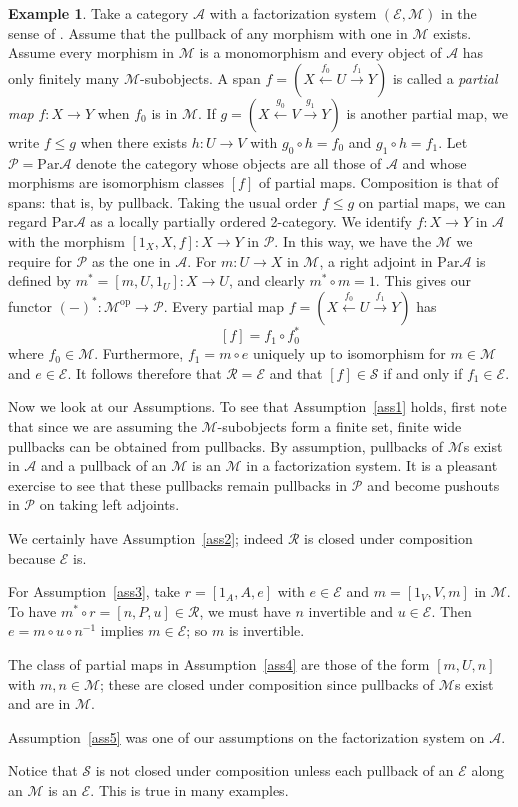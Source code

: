 \documentclass[a4paper,12pt,reqno]{amsart}
\theoremstyle{definition}
\newtheorem{example}[theorem]{Example}
\theoremstyle{fact}
\theoremstyle{genquest}
\theoremstyle{step}
\newcommand{\dd}{\colon}
\newcommand{\lra}{\longrightarrow}
\newcommand{\lla}{\longleftarrow}
\newcommand{\ra}{\rightarrow}
\def\CA{{\mathscr A}}
\def\CE{{\mathscr E}}
\def\CM{{\mathscr M}}
\def\CP{{\mathscr P}}
\def\CR{{\mathscr R}}
\def\CS{{\mathscr S}}
\begin{document}
\begin{example}\label{Ex1+}
Take a category $\CA$ with a factorization system $(\CE,\CM)$ in the sense of \cite{FreydKelly}. 
Assume that the pullback of any morphism with one in $\CM$ exists. 
Assume every morphism in $\CM$ is a monomorphism and every object
of $\CA$ has only finitely many $\CM$-subobjects. 
A span $f = (X\stackrel{f_0}\lla U \stackrel{f_1}\lra Y)$ is called a {\em partial map}
$f : X\lra Y$ when $f_0$ is in $\CM$. 
If $g = (X\stackrel{g_0}\lla V \stackrel{g_1}\lra Y)$ is another partial map,
we write $f\le g$ when there exists $h:U\ra V$ with $g_0\circ h=f_0$ and $g_1\circ h=f_1$.  
Let $\CP= \mathrm{Par}\CA$ 
denote the category
whose objects are all those of $\CA$ and whose morphisms are isomorphism
classes $[f]$ of partial maps. Composition is that of spans: that is, by pullback.
Taking the usual order $f\le g$ on partial maps, we can regard $\mathrm{Par}\CA$
as a locally partially ordered 2-category.
We identify $f\dd X \ra Y$ in $\CA$ with the morphism $[1_X,X,f] \dd X \lra Y$ in $\CP$.
In this way, we have the $\CM$ we require for $\CP$ as the one in $\CA$.
For $m\dd U\ra X$ in $\CM$, a right adjoint in $\mathrm{Par}\CA$ is defined by 
$m^*= [m,U,1_U] : X\ra U$, and clearly $m^*\circ m = 1$.
This gives our functor $(-)^*\dd \CM^{\mathrm{op}} \ra \CP$. 
Every partial map $f = (X\stackrel{f_0}\lla U \stackrel{f_1}\lra Y)$ has 
$$[f] = f_{1}\circ f_0^* $$
where $f_0\in \CM$. Furthermore, $f_1 = m\circ e$ uniquely up to isomorphism
for $m\in \CM$ and $e\in \CE$. 
It follows therefore that $\CR=\CE$ and that $[f]\in \CS$ if and only if $f_1\in \CE$.

Now we look at our Assumptions. To see that Assumption~\ref{ass1} holds, first note
that since we are assuming the $\CM$-subobjects form a finite set, 
finite wide pullbacks can be obtained from pullbacks.
By assumption, pullbacks of $\CM$s exist in $\CA$ and a pullback of an 
$\CM$ is an $\CM$ in a factorization system.
It is a pleasant exercise to see that these pullbacks remain pullbacks in $\CP$
and become pushouts in $\CP$ on taking left adjoints. 

We certainly have Assumption~\ref{ass2}; 
indeed $\CR$ is closed under composition because $\CE$ is.

For Assumption~\ref{ass3}, take $r=[1_A,A,e]$ with $e\in \CE$ and 
$m=[1_V,V,m]$ in $\CM$. To have $m^*\circ r = [n,P,u] \in \CR$, we must have
$n$ invertible and $u\in \CE$. Then $e=m\circ u \circ n^{-1}$ implies $m\in \CE$;
so $m$ is invertible. 

The class of partial maps in Assumption~\ref{ass4} are those
of the form $[m,U,n]$ with $m,n\in \CM$; these are closed under composition since
pullbacks of $\CM$s exist and are in $\CM$. 

Assumption~\ref{ass5} was one of our assumptions on the factorization system on $\CA$. 

Notice that $\CS$ is not closed under composition unless each pullback of an $\CE$
along an $\CM$ is an $\CE$. This is true in many examples. 
\end{example}
\end{document}
